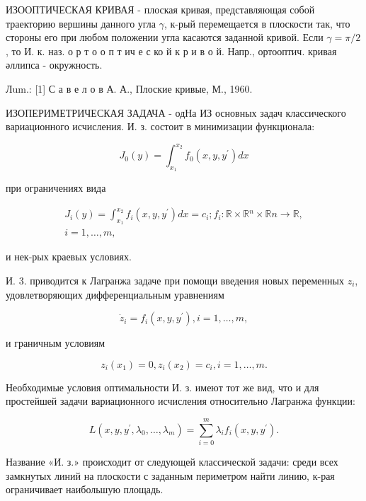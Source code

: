 \documentclass[10pt]{article}
\begin{document}
ИЗООПТИЧЕСКАЯ КРИВАЯ - плоская кривая, представляющая собой траекторию вершины данного угла $\gamma$, к-рый перемещается в плоскости так, что стороны его при любом положении угла касаются заданной кривой. Если $\gamma=\pi / 2$, то И. к. наз. о р т о о п т ич е с ко й к р и в о й. Напр., ортооптич. кривая әллипса - окружность.



Лum.: [1] С а в е л о в А. А., Плоские кривые, М., 1960.



ИЗОПЕРИМЕТРИЧЕСКАЯ ЗАДАЧА - одНа ИЗ основных задач классического вариационного исчисления. И. з. состоит в минимизации функционала:



\[

J_{0}(y)=\int_{x_{1}}^{x_{2}} f_{0}\left(x, y, y^{\prime}\right) d x

\]



при ограничениях вида



\[

\begin{gathered}

J_{i}(y)=\int_{x_{1}}^{x_{2}} f_{i}\left(x, y, y^{\prime}\right) d x=c_{i} ; f_{i}: \mathbb{R} \times \mathbb{R}{ }^{n} \times \mathbb{R} n \longrightarrow \mathbb{R}, \\

i=1, \ldots, m,

\end{gathered}

\]



и нек-рых краевых условиях.



И. 3. приводится к Лагранжа задаче при помощи введения новых переменных $z_{i}$, удовлетворяющих дифференциальным уравнениям



\[

\dot{z}_{i}=f_{i}\left(x, y, y^{\prime}\right), i=1, \ldots, m,

\]



и граничным условиям



\[

z_{i}\left(x_{1}\right)=0, z_{i}\left(x_{2}\right)=c_{i}, i=1, \ldots, m .

\]



Необходимые условия оптимальности И. з. имеют тот же вид, что и для простейшей задачи вариационного исчисления относительно Лагранжа функции:



\[

L\left(x, y, y^{\prime}, \lambda_{0}, \ldots, \lambda_{m}\right)=\sum_{i=0}^{m} \lambda_{i} f_{i}\left(x, y, y^{\prime}\right) .

\]



Название «И. з.» происходит от следующей классической задачи: среди всех замкнутых линий на плоскости с заданным периметром найти линию, к-рая ограничивает наибольшую площадь.
\end{document}

